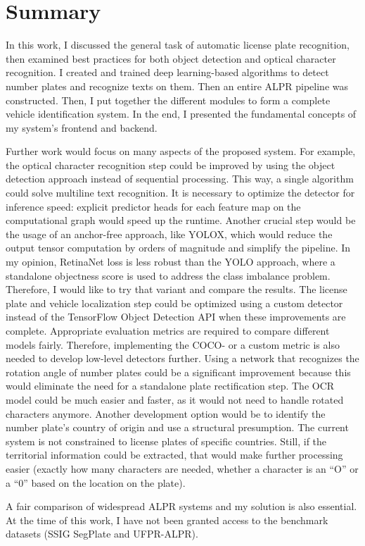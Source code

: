 \chapter{Summary}

In this work, I discussed the general task of automatic license plate recognition, then examined best practices for both object detection and optical character recognition. I created and trained deep learning-based algorithms to detect number plates and recognize texts on them. Then an entire ALPR pipeline was constructed. Then, I put together the different modules to form a complete vehicle identification system. In the end, I presented the fundamental concepts of my system's frontend and backend.

Further work would focus on many aspects of the proposed system. For example, the optical character recognition step could be improved by using the object detection approach instead of sequential processing. This way, a single algorithm could solve multiline text recognition. It is necessary to optimize the detector for inference speed: explicit predictor heads for each feature map on the computational graph would speed up the runtime. Another crucial step would be the usage of an anchor-free approach, like YOLOX\cite{YOLOX}, which would reduce the output tensor computation by orders of magnitude and simplify the pipeline. In my opinion, RetinaNet\cite{RetinaNet} loss is less robust than the YOLO approach, where a standalone objectness score is used to address the class imbalance problem. Therefore, I would like to try that variant and compare the results. The license plate and vehicle localization step could be optimized using a custom detector instead of the TensorFlow Object Detection API when these improvements are complete. Appropriate evaluation metrics are required to compare different models fairly. Therefore, implementing the COCO- or a custom metric is also needed to develop low-level detectors further. Using a network that recognizes the rotation angle of number plates could be a significant improvement because this would eliminate the need for a standalone plate rectification step. The OCR model could be much easier and faster, as it would not need to handle rotated characters anymore. Another development option would be to identify the number plate's country of origin and use a structural presumption. The current system is not constrained to license plates of specific countries. Still, if the territorial information could be extracted, that would make further processing easier (exactly how many characters are needed, whether a character is an ``O'' or a ``0'' based on the location on the plate).

A fair comparison of widespread ALPR systems and my solution is also essential. At the time of this work, I have not been granted access to the benchmark datasets (SSIG SegPlate and UFPR-ALPR).

